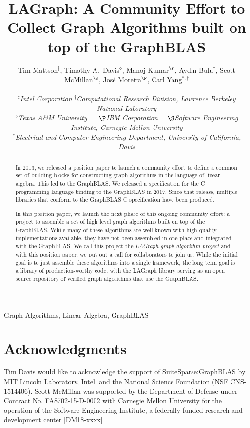 \documentclass[10pt, conference, compsocconf,letter]{IEEEtran}
\title{LAGraph: A Community Effort to Collect Graph Algorithms built on top of the GraphBLAS}
\author{
Tim Mattson$^\ddag$, Timothy A.~Davis$^\diamond$, Manoj Kumar$^\P$, Ayd\i n Bulu\qc$^\dag$, Scott McMillan$^\S$, Jos\'e Moreira$^\P$, Carl Yang$^{*,\dag}$ \\
\\

 \normalsize
 {\em $^\ddag$Intel Corporation}  {\em $^\dag$Computational Research Division, Lawrence Berkeley National Laboratory} \\
{\em $^\diamond$Texas A\&M University} ~~ {\em $\P$IBM Corporation}~~ {\em $\S$Software Engineering Institute, Carnegie Mellon University}   \\
{\em $^*$Electrical and Computer Engineering Department, University of California, Davis}
 }
\begin{document}
\maketitle

\begin{abstract}

In 2013, we released a position paper to launch a community effort to define a 
common set of building blocks for constructing graph algorithms in the language of linear algebra.
This led to the GraphBLAS.   We released a specification for the C programming language binding to the
GraphBLAS in 2017.  Since that release, multiple libraries that conform to the 
GraphBLAS C specification have been produced.

In this position paper, we launch the next phase of this ongoing community effort: a project to
assemble a set of high level graph algorithms built on top of the GraphBLAS.  While many 
of these algorithms are well-known with high quality implementations available,
they have not been assembled in one place and integrated with the GraphBLAS.  We call 
this project the \emph{LAGraph graph algorithm project} and with this position paper, we put out a 
call for collaborators to join us.  While the initial goal is to just assemble
these algorithms into a single framework, the long term goal is a library of production-worthy code,
with the LAGraph library serving as an open source repository of verified graph algorithms that use the
GraphBLAS. 

\end{abstract}

\begin{IEEEkeywords}
Graph Algorithms, Linear Algebra, GraphBLAS
\end{IEEEkeywords}











\section*{Acknowledgments}

Tim Davis would like to acknowledge the support of SuiteSparse:GraphBLAS by MIT
Lincoln Laboratory, Intel, and the National Science Foundation (NSF
CNS-1514406).  Scott McMillan was supported by the Department of 
Defense under Contract No. FA8702-15-D-0002 with Carnegie Mellon 
University for the operation of the Software Engineering Institute, 
a federally funded research and development center [DM18-xxxx]



\end{document}
